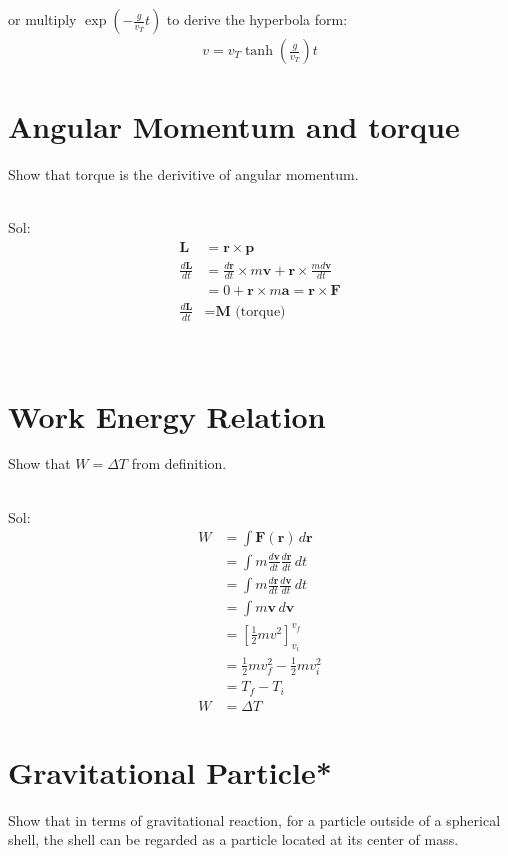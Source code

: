\documentclass[11pt, a4paper, oneside]{book}
\numberwithin{equation}{section}%
\begin{document}
or multiply $ \displaystyle{\exp\left(-\frac{g}{v_T}t\right)} $ to derive the hyperbola form:
\begin{align}
	v = v_T\tanh \left(\frac{g}{v_T}\right)t
\end{align}



\section{Angular Momentum and torque}
Show that torque is the derivitive of angular momentum.

~\\
Sol:
\begin{align}
	\textbf{L} &= \textbf{r} \times \textbf{p}\\
	\frac{d\textbf{L}}{dt} &= \frac{d\textbf{r}}{dt} \times m\textbf{v} + \textbf{r} \times \frac{md\textbf{v}}{dt}\\
	&=	0 + \textbf{r} \times m\textbf{a} = \textbf{r} \times \textbf{F}\\
	\frac{d\textbf{L}}{dt} &= \textbf{M} \text{ (torque)}
\end{align}

~\\
\section{Work Energy Relation}
Show that $W = \Delta T$ from definition.

~\\
Sol:
\begin{align}
	W &= \int \textbf{F}(\textbf{r})\,d\textbf{r}\\
	&= \int m\frac{d\textbf{v}}{dt}\frac{d\textbf{r}}{dt}\,dt\\
	&= \int m\frac{d\textbf{r}}{dt}\frac{d\textbf{v}}{dt}\,dt\\
	&= \int m\textbf{v}\,d\textbf{v}\\
	&= \left[\frac{1}{2}mv^2\right]^{v_f}_{v_i}\\
	&= \frac{1}{2}mv_f^2 - \frac{1}{2}mv_i^2\\
	&=	T_f - T_i\\
	W &= \Delta T
\end{align}








\section{Gravitational Particle*}
Show that in terms of gravitational reaction, for a particle outside of a spherical shell, the shell can be regarded as a particle located at its center of mass.
\end{document}
